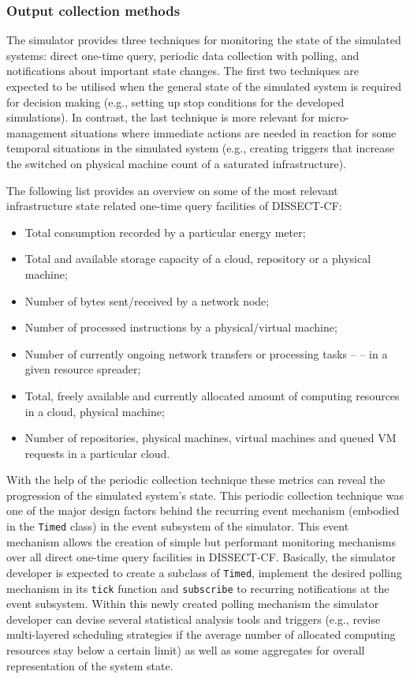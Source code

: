 \documentclass[sort, compress, 5p]{elsarticle}
\begin{document}
\subsubsection{Output collection methods}

The simulator provides three techniques for monitoring the state of the simulated systems:  direct one-time query,  periodic data collection with polling, and  notifications about important state changes. The first two techniques are expected to be utilised when the general state of the simulated system is required for decision making (e.g., setting up stop conditions for the developed simulations). In contrast, the last technique is more relevant for micro-management situations where immediate actions are needed in reaction for some temporal situations in the simulated system (e.g., creating triggers that increase the switched on physical machine count of a saturated infrastructure).

The following list provides an overview on some of the most relevant infrastructure state related one-time query facilities of DISSECT-CF:
\begin{itemize}
\item Total consumption recorded by a particular energy meter;
\item Total and available storage capacity of a cloud, repository or a physical machine;
\item Number of bytes sent/received by a network node;
\item Number of processed instructions by a physical/virtual machine;
\item Number of currently ongoing network transfers or processing tasks --  -- in a given resource spreader;
\item Total, freely available and currently allocated amount of computing resources in a cloud, physical machine;
\item Number of repositories, physical machines, virtual machines and queued VM requests in a particular cloud.
\end{itemize}
With the help of the periodic collection technique these metrics can reveal the progression of the simulated system's state. This periodic collection technique was one of the major design factors behind the recurring event mechanism (embodied in the \verb+Timed+ class) in the event subsystem of the simulator. This event mechanism allows the creation of simple but performant monitoring mechanisms over all direct one-time query facilities in DISSECT-CF. Basically, the simulator developer is expected to create a subclass of \verb+Timed+, implement the desired polling mechanism in its \verb+tick+ function and \verb+subscribe+ to recurring notifications at the event subsystem. Within this newly created polling mechanism the simulator developer can devise several statistical analysis tools and triggers (e.g., revise multi-layered scheduling strategies if the average number of allocated computing resources stay below a certain limit) as well as some aggregates for overall representation of the system state.
\end{document}
